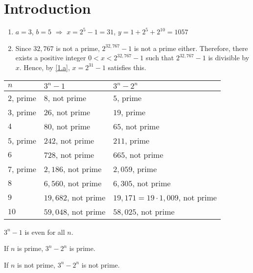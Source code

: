 \section{Introduction}
\begin{exx}
  \begin{enumerate}[label=(\alph*)]
    \item\label{1.a} $a=3$, $b=5$ $\Rightarrow$ $x=2^5-1=31$, $y=1+2^5+2^{10}=1057$
    \item Since $32,767$ is not a prime, $2^{32,767} - 1$ is not a prime either.
    Therefore, there exists a positive integer $0<x<2^{32,767}-1$ such that
    $2^{32,767}-1$ is divisible by $x$. Hence, by \ref{1.a}, $x=2^{31}-1$ satisfies this.
  \end{enumerate}
\end{exx}

\begin{exx}
  \begin{tabular}{l l l}
    $n$ & $3^n - 1$ & $3^n - 2^n$ \\
    \hline
    $2$, prime & $8$, not prime & $5$, prime \\
    $3$, prime & $26$, not prime & $19$, prime \\
    $4$ & $80$, not prime & $65$, not prime \\
    $5$, prime & $242$, not prime & $211$, prime \\
    $6$ & $728$, not prime & $665$, not prime \\
    $7$, prime & $2,186$, not prime & $2,059$, prime \\
    $8$ & $6,560$, not prime & $6,305$, not prime \\
    $9$ & $19,682$, not prime & $19,171=19\cdot1,009$, not prime \\
    $10$ & $59,048$, not prime & $58,025$, not prime
  \end{tabular}
  \begin{ab}
    $3^n-1$ is even for all $n$.
  \end{ab}
  \begin{ab}
    If $n$ is prime, $3^n-2^n$ is prime.
  \end{ab}
  \begin{ab}
    If $n$ is not prime, $3^n-2^n$ is not prime.
  \end{ab}
\end{exx}

